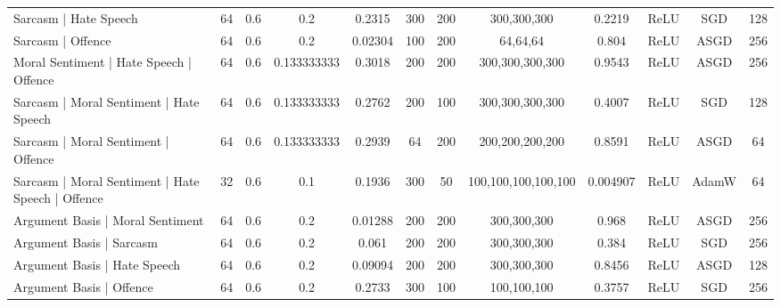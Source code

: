 {\begin{landscape}
\begin{table}[]
{\begin{tabular}{l|ccccccccccc}
      Sarcasm | Hate Speech                                              & 64         & 0.6              & 0.2              & 0.2315  & 300           & 200    & 300,300,300             & 0.2219        & ReLU          & SGD       & 128        \\
      Sarcasm | Offence                                                  & 64         & 0.6              & 0.2              & 0.02304 & 100           & 200    & 64,64,64                & 0.804         & ReLU          & ASGD      & 256        \\
      Moral Sentiment | Hate Speech | Offence                            & 64         & 0.6              & 0.133333333      & 0.3018  & 200           & 200    & 300,300,300,300         & 0.9543        & ReLU          & ASGD      & 256        \\
      Sarcasm | Moral Sentiment | Hate Speech                            & 64         & 0.6              & 0.133333333      & 0.2762  & 200           & 100    & 300,300,300,300         & 0.4007        & ReLU          & SGD       & 128        \\
      Sarcasm | Moral Sentiment | Offence                                & 64         & 0.6              & 0.133333333      & 0.2939  & 64            & 200    & 200,200,200,200         & 0.8591        & ReLU          & ASGD      & 64         \\
      Sarcasm | Moral Sentiment | Hate Speech | Offence                  & 32         & 0.6              & 0.1              & 0.1936  & 300           & 50     & 100,100,100,100,100     & 0.004907      & ReLU          & AdamW     & 64         \\
      Argument Basis | Moral Sentiment                                   & 64         & 0.6              & 0.2              & 0.01288 & 200           & 200    & 300,300,300             & 0.968         & ReLU          & ASGD      & 256        \\
      Argument Basis | Sarcasm                                           & 64         & 0.6              & 0.2              & 0.061   & 200           & 200    & 300,300,300             & 0.384         & ReLU          & SGD       & 256        \\
      Argument Basis | Hate Speech                                       & 64         & 0.6              & 0.2              & 0.09094 & 200           & 200    & 300,300,300             & 0.8456        & ReLU          & ASGD      & 128        \\
      Argument Basis | Offence                                           & 64         & 0.6              & 0.2              & 0.2733  & 300           & 100    & 100,100,100             & 0.3757        & ReLU          & SGD       & 256        \\

\end{tabular}}
\end{table}
\end{landscape}}
